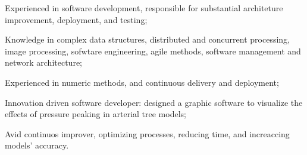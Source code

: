 
\begin{list}

    \item Experienced in software development, responsible for substantial architeture improvement,
    deployment, and testing;
    
    \item Knowledge in complex data structures, distributed and concurrent processing, image processing,
    sofwtare engineering, agile methods, software management and network architecture;
    
    \item Experienced in numeric methods, and continuous delivery and deployment;
    
    \item Innovation driven software developer: designed a graphic software to visualize the effects of pressure peaking in arterial tree models;
    
    \item Avid continuos improver, optimizing processes, reducing time, and increaccing models' accuracy.
    
\end{list}



